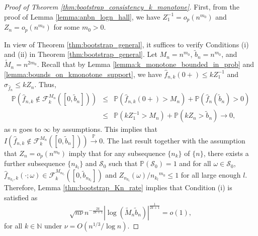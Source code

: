\documentclass[12pt,letterpaper, twoside, openany]{article}
\theoremstyle{plain}
\begin{document}
\begin{proof}[Proof of Theorem \ref{thm:bootstrap_consistency_k_monotone}]
First, from the proof of Lemma \ref{lemma:anbn_logn_hall}, we have $Z_1^{-1} = o_p(n^{m_0})$ and $Z_n = o_p(n^{m_0})$ for some $m_0 > 0$.

In view of Theorem \ref{thm:bootstrap_general}, it suffices  to verify Conditions (i) and (ii) in  Theorem \ref{thm:bootstrap_general}. Let $M_n = n^{m_0}$, $\tilde{b}_n = n^{m_0}$, and $\widetilde{M}_n = n^{2m_0}$.
Recall that by Lemma \ref{lemma:k_monotone_bounded_in_prob} and \ref{lemma:bounds_on_kmonotone_support}, we have $\hat{f}_{n,k}(0+) \leq kZ^{-1}_1$ and $\sigma_{\hat{f}_n} \leq k Z_n$. Thus,
\begin{eqnarray*}
	\mathbb{P}(\hat{f}_{n,k} \notin \mathcal{F}^{M_n}_k([0,\tilde{b}_n]))  & \leq & \mathbb{P}(\hat{f}_{n,k}(0+) > M_n) + \mathbb{P}(\hat{f}_n(\tilde{b}_n) > 0) \\
	& \leq & \mathbb{P}(kZ^{-1}_1 > M_n) + \mathbb{P}(kZ_n > \tilde{b}_n) \rightarrow 0,
\end{eqnarray*}
as $n$ goes to $\infty$ by assumptions. This implies that $I(\hat{f}_{n,k} \notin \mathcal{F}^{M_{n}}_k ([0, \tilde{b}_n])) \stackrel{\mathbb{P}}{\rightarrow } 0$. The last result together with the assumption that $Z_n = o_p(n^{m_0})$ imply that for any subsequence $\{n_k\}$ of $\{n\}$, there exists a further subsequence $\{n_{k_l}\}$ and $\mathcal{S}_0$ such that $\mathbb{P}(\mathcal{S}_0) = 1$ and for all $\omega \in \mathcal{S}_0$, $\hat{f}_{n_{k_l},k}(\cdot;\omega) \in \mathcal{F}^{M_{n_{k_l}}}_k([0,\tilde{b}_{n_{k_l}}])$ and $Z_{n_{k_l}}(\omega)/{n_{k_l}}^{m_0} \leq 1$  for all large enough $l$.  Therefore, Lemma \ref{thm:bootstrap_Kn_rate} implies that Condition (i) is satisfied as
\begin{equation*}
	\sqrt{n \nu} n^{- \frac{2k}{2k+1}} | \log (\widetilde{M}_n \tilde{b}_n)|^{\frac{1}{2k+1}} = o(1),
\end{equation*}
for all $k \in \mathbb{N}$ under $\nu = O(n^{1/3}/\log n)$.



\end{proof}
\end{document}

